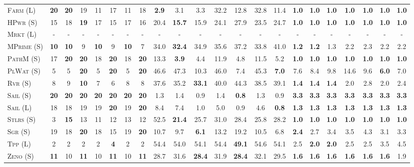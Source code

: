 \documentclass[11pt,landscape]{article}
\begin{document}
\begin{table*}[tb]
{\begin{tabular}{|l||ccccccc||ccccccc||ccccccc||}
\textsc{Farm} (L)&\textbf{20}&\textbf{20}&19&11&17&11&18&\textbf{2.9}&3.1&3.3&32.2&12.8&32.8&11.4&\textbf{1.0}&\textbf{1.0}&\textbf{1.0}&\textbf{1.0}&\textbf{1.0}&\textbf{1.0}&\textbf{1.0}\\
\textsc{HPwr} (S)&15&18&\textbf{19}&17&15&17&16&20.4&\textbf{15.7}&15.9&24.1&27.9&23.5&24.7&\textbf{1.0}&\textbf{1.0}&\textbf{1.0}&\textbf{1.0}&\textbf{1.0}&\textbf{1.0}&\textbf{1.0}\\
\textsc{Mrkt} (L)&-&-&-&-&-&-&-&-&-&-&-&-&-&-&-&-&-&-&-&-&-\\
\textsc{MPrime} (S)&\textbf{10}&\textbf{10}&9&\textbf{10}&9&\textbf{10}&7&34.0&\textbf{32.4}&34.9&35.6&37.2&33.8&41.0&\textbf{1.2}&\textbf{1.2}&1.3&2.2&2.3&2.2&2.2\\
\textsc{PathM} (S)&17&\textbf{20}&\textbf{20}&18&\textbf{20}&18&\textbf{20}&13.3&\textbf{3.9}&4.4&11.9&4.8&11.5&5.2&\textbf{1.0}&\textbf{1.0}&\textbf{1.0}&\textbf{1.0}&\textbf{1.0}&\textbf{1.0}&\textbf{1.0}\\
\textsc{PlWat} (S)&5&5&\textbf{20}&5&\textbf{20}&5&\textbf{20}&46.6&47.3&10.3&46.0&7.4&45.3&\textbf{7.0}&7.6&8.4&9.8&14.6&9.6&\textbf{6.0}&7.0\\
\textsc{Rvr} (S)&8&9&\textbf{10}&7&6&8&8&37.6&35.2&\textbf{33.1}&40.0&44.3&38.5&39.1&\textbf{1.4}&\textbf{1.4}&\textbf{1.4}&2.0&2.8&2.0&2.4\\
\textsc{Sail} (S)&\textbf{20}&\textbf{20}&\textbf{20}&\textbf{20}&\textbf{20}&\textbf{20}&\textbf{20}&1.3&1.4&0.9&1.4&\textbf{0.8}&1.3&0.9&\textbf{3.3}&\textbf{3.3}&\textbf{3.3}&\textbf{3.3}&\textbf{3.3}&\textbf{3.3}&\textbf{3.3}\\
\textsc{Sail} (L)&18&18&19&19&\textbf{20}&19&\textbf{20}&8.4&7.4&1.0&5.0&0.9&4.6&\textbf{0.8}&\textbf{1.3}&\textbf{1.3}&\textbf{1.3}&\textbf{1.3}&\textbf{1.3}&\textbf{1.3}&\textbf{1.3}\\
\textsc{Stlrs} (S)&3&\textbf{15}&13&11&12&13&12&52.5&\textbf{21.4}&25.7&31.0&28.4&25.8&28.2&\textbf{1.0}&\textbf{1.0}&\textbf{1.0}&\textbf{1.0}&\textbf{1.0}&\textbf{1.0}&\textbf{1.0}\\
\textsc{Sgr} (S)&19&18&\textbf{20}&18&15&19&\textbf{20}&10.7&9.7&\textbf{6.1}&13.2&19.2&10.5&6.8&\textbf{2.4}&2.7&3.4&3.5&4.3&3.1&3.3\\
\textsc{Tpp} (L)&2&2&2&2&\textbf{4}&2&2&54.4&54.0&54.1&54.4&\textbf{49.1}&54.6&54.1&2.5&\textbf{2.0}&\textbf{2.0}&2.5&2.5&3.5&4.5\\
\textsc{Zeno} (S)&\textbf{11}&10&\textbf{11}&10&\textbf{11}&10&\textbf{11}&28.7&31.6&\textbf{28.4}&31.9&\textbf{28.4}&32.1&29.5&\textbf{1.6}&\textbf{1.6}&\textbf{1.6}&\textbf{1.6}&\textbf{1.6}&\textbf{1.6}&1.9\\

\end{tabular}}
\end{table*}
\end{document}
